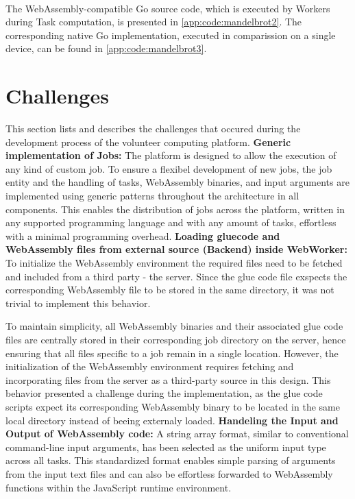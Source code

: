 ~\\
The WebAssembly-compatible Go source code, which is executed by Workers during Task computation, is presented in \autoref{app:code:mandelbrot2}. The corresponding native Go implementation, executed in comparission on a single device, can be found in \autoref{app:code:mandelbrot3}.

\section{Challenges}
\label{sec:implementation:challenges}
This section lists and describes the  challenges that occured during the development process of the volunteer computing platform.
\newline
\newline
\textbf{Generic implementation of Jobs:}
\newline
The platform is designed to allow the execution of any kind of custom job. To ensure a flexibel development of new jobs, the job entity and the handling of tasks, WebAssembly binaries, and input arguments are implemented using generic patterns throughout the architecture in all components. This enables the distribution of jobs across the platform, written in any supported programming language and with any amount of tasks, effortless with a minimal programming overhead.
\newline
\newline
\textbf{Loading gluecode and WebAssembly files from external source (Backend) inside WebWorker:}
\newline
To initialize the WebAssembly environment the required files need to be fetched and included from a third party - the server. Since the glue code file exspects the corresponding WebAssembly file to be stored in the same directory, it was not trivial to implement this behavior.

To maintain simplicity, all WebAssembly binaries and their associated glue code files are centrally stored in their corresponding job directory on the server, hence ensuring that all files specific to a job remain in a single location. However, the initialization of the WebAssembly environment requires fetching and incorporating files from the server as a third-party source in this design. This behavior presented a challenge during the implementation, as the glue code scripts expect its corresponding WebAssembly binary to be located in the same local directory instead of beeing externaly loaded.
\newline
\newline
\textbf{Handeling the Input and Output of WebAssembly code:}
\newline
A string array format, similar to conventional command-line input arguments, has been selected as the uniform input type across all tasks. This standardized format enables simple parsing of arguments from the input text files and can also be effortless forwarded to WebAssembly functions within the JavaScript runtime environment.

